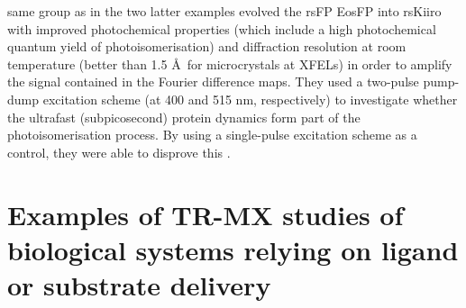 same group as in the two latter examples evolved the rsFP EosFP into rsKiiro with improved photochemical properties (which include a high photochemical quantum yield of photoisomerisation) and diffraction resolution at room temperature (better than 1.5 \AA\ for microcrystals at XFELs) in order to amplify the signal contained in the Fourier difference maps. They used a two-pulse pump-dump excitation scheme (at 400 and 515 nm, respectively) to investigate whether the ultrafast (subpicosecond) protein dynamics form part of the photoisomerisation process. By using a single-pulse excitation scheme as a control, they were able to disprove this \parencite{hutchisonOpticalControlUltrafast2023}.

\section{Examples of TR-MX studies of biological systems relying on ligand or substrate delivery}\label{sec:diffusion}


